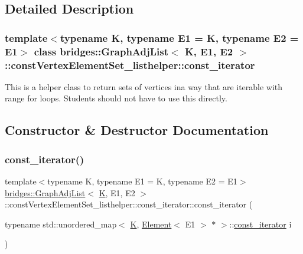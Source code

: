 \subsection{Detailed Description}
\subsubsection*{template$<$typename K, typename E1 = K, typename E2 = E1$>$\newline
class bridges\+::\+Graph\+Adj\+List$<$ K, E1, E2 $>$\+::const\+Vertex\+Element\+Set\+\_\+listhelper\+::const\+\_\+iterator}

This is a helper class to return sets of vertices ina way that are iterable with range for loops. Students should not have to use this directly. 

\subsection{Constructor \& Destructor Documentation}
\mbox{\label{classbridges_1_1_graph_adj_list_1_1const_vertex_element_set__listhelper_1_1const__iterator_a5b0e97db3f9ce1a92600ab27634dfb25}} 
\subsubsection{\texorpdfstring{const\+\_\+iterator()}{const\_iterator()}}
{\footnotesize\ttfamily template$<$typename K, typename E1 = K, typename E2 = E1$>$ \\
\hyperlink{classbridges_1_1_graph_adj_list}{bridges\+::\+Graph\+Adj\+List}$<$ \hyperlink{namespacebridges_acfb0a4f7877d8f63de3e6862004c50edaa5f3c6a11b03839d46af9fb43c97c188}{K}, E1, E2 $>$\+::const\+Vertex\+Element\+Set\+\_\+listhelper\+::const\+\_\+iterator\+::const\+\_\+iterator (\begin{DoxyParamCaption}\item[{typename std\+::unordered\+\_\+map$<$ \hyperlink{namespacebridges_acfb0a4f7877d8f63de3e6862004c50edaa5f3c6a11b03839d46af9fb43c97c188}{K}, \hyperlink{classbridges_1_1_element}{Element}$<$ E1 $>$ $\ast$ $>$\+::\hyperlink{classbridges_1_1_graph_adj_list_1_1const_vertex_element_set__listhelper_1_1const__iterator}{const\+\_\+iterator}}]{i }\end{DoxyParamCaption})\hspace{0.3cm}{\ttfamily [inline]}}



